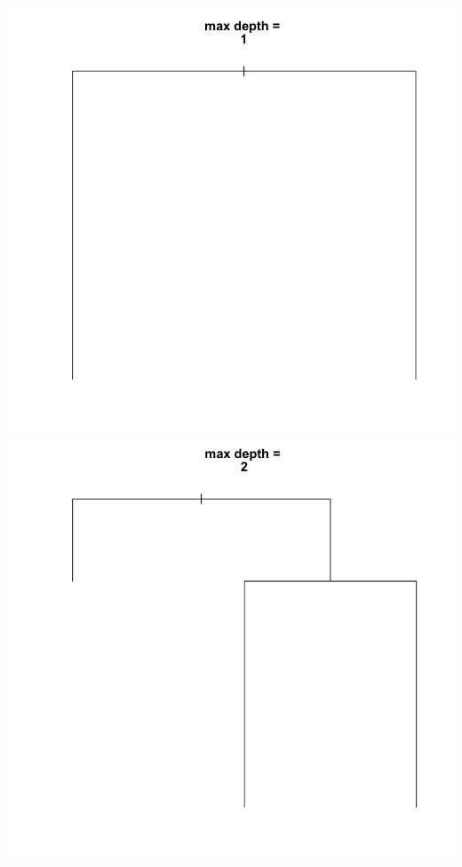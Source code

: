 \documentclass[11pt]{article}
\begin{document}
\begin{center}
\includegraphics[scale=0.25]{images/mdepth=1}
\includegraphics[scale=0.25]{images/mdepth=2}

\end{center}
\end{document}
